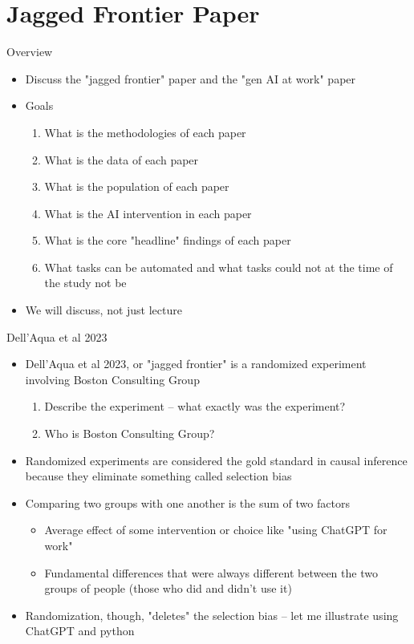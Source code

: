 \documentclass{beamer}
\begin{document}



\section{Jagged Frontier Paper}

\begin{frame}{Overview}

\begin{itemize}
\item Discuss the "jagged frontier" paper and the "gen AI at work" paper
\item Goals
	\begin{enumerate}
	\item What is the methodologies of each paper
	\item What is the data of each paper
	\item What is the population of each paper
	\item What is the AI intervention in each paper
	\item What is the core "headline" findings of each paper
	\item What tasks can be automated and what tasks could not at the time of the study not be
	\end{enumerate}
\item We will discuss, not just lecture
\end{itemize}

\end{frame}

\begin{frame}{Dell'Aqua et al 2023}

\begin{itemize}
\item Dell'Aqua et al 2023, or "jagged frontier" is a randomized experiment involving Boston Consulting Group
	\begin{enumerate}
	\item Describe the experiment -- what exactly was the experiment?
	\item Who is Boston Consulting Group?
	\end{enumerate}
\item Randomized experiments are considered the gold standard in causal inference because they eliminate something called selection bias
\item Comparing two groups with one another is the sum of two factors
	\begin{itemize}
	\item Average effect of some intervention or choice like "using ChatGPT for work"
	\item Fundamental differences that were always different between the two groups of people (those who did and didn't use it)
	\end{itemize}
\item Randomization, though, "deletes" the selection bias -- let me illustrate using ChatGPT and python
\end{itemize}

\end{frame}
\end{document}
